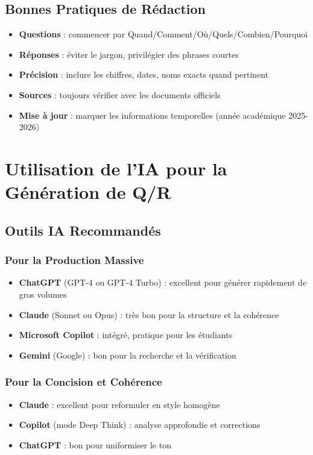 \documentclass[11pt,a4paper]{article}
\begin{document}
\subsection{Bonnes Pratiques de Rédaction}
\begin{astuce}
\begin{itemize}
    \item \textbf{Questions} : commencer par Quand/Comment/Où/Quels/Combien/Pourquoi
    \item \textbf{Réponses} : éviter le jargon, privilégier des phrases courtes
    \item \textbf{Précision} : inclure les chiffres, dates, noms exacts quand pertinent
    \item \textbf{Sources} : toujours vérifier avec les documents officiels
    \item \textbf{Mise à jour} : marquer les informations temporelles (année académique 2025-2026)
\end{itemize}
\end{astuce}

\newpage
\section{Utilisation de l'IA pour la Génération de Q/R}
\label{sec:ia-prompting}

\subsection{Outils IA Recommandés}
\subsubsection{Pour la Production Massive}
\begin{itemize}
    \item \textbf{ChatGPT} (GPT-4 ou GPT-4 Turbo) : excellent pour générer rapidement de gros volumes
    \item \textbf{Claude} (Sonnet ou Opus) : très bon pour la structure et la cohérence
    \item \textbf{Microsoft Copilot} : intégré, pratique pour les étudiants
    \item \textbf{Gemini} (Google) : bon pour la recherche et la vérification
\end{itemize}

\subsubsection{Pour la Concision et Cohérence}
\begin{itemize}
    \item \textbf{Claude} : excellent pour reformuler en style homogène
    \item \textbf{Copilot} (mode Deep Think) : analyse approfondie et corrections
    \item \textbf{ChatGPT} : bon pour uniformiser le ton
\end{itemize}
\end{document}
